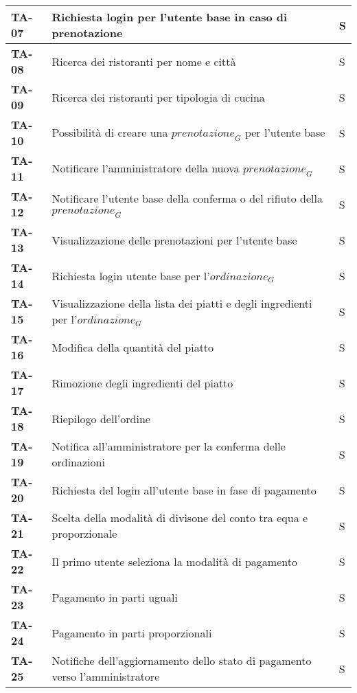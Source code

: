 \begin{longtable}{|>{\centering\arraybackslash}p{1.5cm}|p{14cm}|p{1cm}|}
    \textbf{TA-07} & Richiesta login per l'utente base in caso di prenotazione& S\\
    \hline
    \rowcolor{gray!10}
    \textbf{TA-08} & Ricerca dei ristoranti per nome e città & S\\
    \hline
    \textbf{TA-09} & Ricerca dei ristoranti per tipologia di cucina & S\\
    \hline
    \rowcolor{gray!10}
    \textbf{TA-10} & Possibilità di creare una $\textit{prenotazione}_G$ per l'utente base & S\\
    \hline
    \textbf{TA-11} & Notificare l'amministratore della nuova $\textit{prenotazione}_G$ & S\\
    \hline
    \rowcolor{gray!10}
    \textbf{TA-12} & Notificare l'utente base della conferma o del rifiuto della $\textit{prenotazione}_G$ & S\\
    \hline
    \textbf{TA-13} & Visualizzazione delle prenotazioni per l'utente base & S\\
    \hline
    \textbf{TA-14} &Richiesta login utente base per l'$\textit{ordinazione}_G$ & S\\
    \hline
    \rowcolor{gray!10}
    \textbf{TA-15} & Visualizzazione della lista dei piatti e degli ingredienti per l'$\textit{ordinazione}_G$ & S\\
    \hline
    \textbf{TA-16} & Modifica della quantità del piatto & S\\
    \hline
    \rowcolor{gray!10}
    \textbf{TA-17} & Rimozione degli ingredienti del piatto & S\\
    \hline
    \textbf{TA-18} & Riepilogo dell'ordine & S\\
    \hline
    \rowcolor{gray!10}
    \textbf{TA-19} & Notifica all'amministratore per la conferma delle ordinazioni & S\\
    \hline
    \textbf{TA-20} & Richiesta del login all'utente base in fase di pagamento & S\\
    \hline
    \rowcolor{gray!10}
    \textbf{TA-21} & Scelta della modalità di divisone del conto tra equa e proporzionale & S\\
    \hline
    \textbf{TA-22} & Il primo utente seleziona la modalità di pagamento & S\\
    \hline
    \rowcolor{gray!10}
    \textbf{TA-23} & Pagamento in parti uguali & S\\
    \hline
    \textbf{TA-24} & Pagamento in parti proporzionali & S\\
    \hline
    \rowcolor{gray!10}
    \textbf{TA-25} & Notifiche dell'aggiornamento dello stato di pagamento verso l'amministratore & S\\

\end{longtable}
